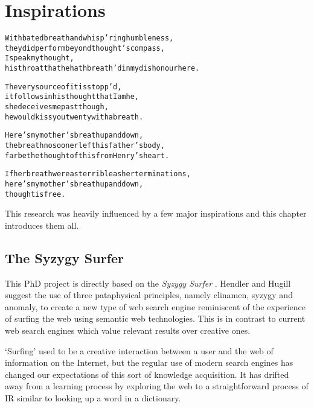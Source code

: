 
\chapter{Inspirations}
\label{ch:inspirations}

\startcontents[chapters]

\vfill

\begin{alltt}\sffamily
With bated breath and whisp'ring humbleness,
they did perform beyond thought's compass,
I speak my thought,
his throat that he hath breath'd in my dishonour here.

The very source of it is stopp'd,
it follows in his thought that I am he,
she deceives me past though,
he would kiss you twenty with a breath.  

Here's my mother's breath up and down,
the breath no sooner left his father's body,
far be the thought of this from Henry's heart.

If her breath were as terrible as her terminations,
here's my mother's breath up and down,
thought is free.
\end{alltt}

\newpage
\minicontents
\spirals

This research was heavily influenced by a few major inspirations and this chapter introduces them all.


\section{The Syzygy Surfer}
\label{s:surfer}

This PhD project is directly based on the \textit{Syzygy Surfer} \autocite{Hendler2011, Hendler2013}. Hendler and Hugill suggest the use of three pataphysical principles, namely clinamen, syzygy and anomaly, to create a new type of web search engine reminiscent of the experience of surfing the web using semantic web technologies. This is in contrast to current web search engines which value relevant results over creative ones.

`Surfing' used to be a creative interaction between a user and the web of information on the Internet, but the regular use of modern search engines has changed our expectations of this sort of knowledge acquisition. It has drifted away from a learning process by exploring the web to a straightforward process of \acf{IR} similar to looking up a word in a dictionary.

